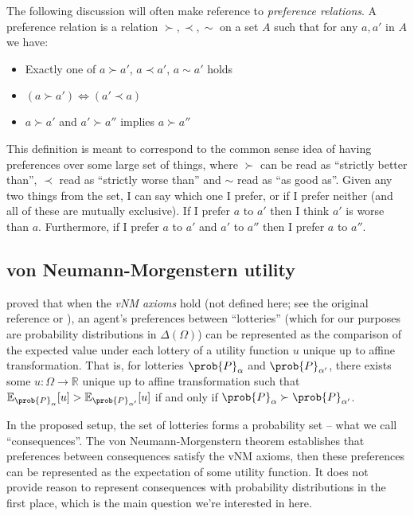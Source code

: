 The following discussion will often make reference to \emph{preference relations}. A preference relation is a relation $\succ,\prec,\sim$ on a set $A$ such that for any $a,a'$ in $A$ we have:
\begin{itemize}
    \item Exactly one of $a\succ a'$, $a\prec a'$, $a\sim a'$ holds
    \item $(a\succ a')\iff(a'\prec a)$
    \item $a\succ a'$ and $a'\succ a''$ implies $a\succ a''$
\end{itemize}

This definition is meant to correspond to the common sense idea of having preferences over some large set of things, where $\succ$ can be read as ``strictly better than'', $\prec$ read as ``strictly worse than'' and $\sim$ read as ``as good as''. Given any two things from the set, I can say which one I prefer, or if I prefer neither (and all of these are mutually exclusive). If I prefer $a$ to $a'$ then I think $a'$ is worse than $a$. Furthermore, if I prefer $a$ to $a'$ and $a'$ to $a''$ then I prefer $a$ to $a''$.

\subsection{von Neumann-Morgenstern utility}

\citet{von_neumann_theory_1944} proved that when the \emph{vNM axioms} hold (not defined here; see the original reference or \citet{steele_decision_2020}), an agent's preferences between ``lotteries'' (which for our purposes are probability distributions in $\Delta(\Omega)$) can be represented as the comparison of the expected value under each lottery of a utility function $u$ unique up to affine transformation. That is, for lotteries $\prob{P}_\alpha$ and $\prob{P}_{\alpha'}$, there exists some $u:\Omega\to \mathbb{R}$ unique up to affine transformation such that $\mathbb{E}_{\prob{P}_\alpha}[u]> \mathbb{E}_{\prob{P}_{\alpha'}}[u]$ if and only if $\prob{P}_{\alpha} \succ \prob{P}_{\alpha'}$.

In the proposed setup, the set of lotteries forms a probability set -- what we call ``consequences''. The von Neumann-Morgenstern theorem establishes that preferences between consequences satisfy the vNM axioms, then these preferences can be represented as the expectation of some utility function. It does not provide reason to represent consequences with probability distributions in the first place, which is the main question we're interested in here.

